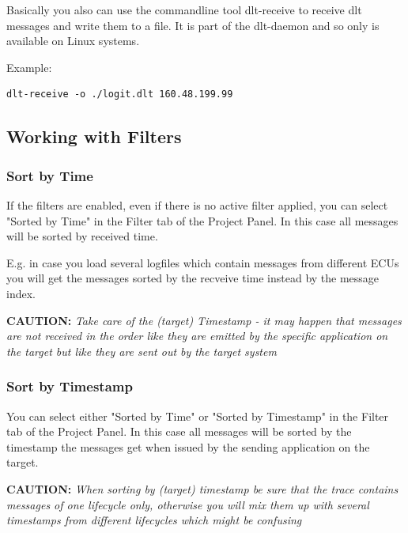 \documentclass[a4paper,11pt]{article}
\newcommand{\caution}[1]{\begin{ibox} \textbf{CAUTION:} \emph{#1} \end{ibox}}
\begin{document}
Basically you also can use the commandline tool dlt-receive to receive dlt messages and write them to a file.
It is part of the dlt-daemon and so only is available on Linux systems.

Example:

\begin{verbatim}
dlt-receive -o ./logit.dlt 160.48.199.99
\end{verbatim}



\pagebreak

\subsection{Working with Filters}
\label{workingwithfilters}


\subsubsection{Sort by Time}
\label{sortbytime}
If the filters are enabled, even if there is no active filter applied, you can select "Sorted by Time" in the
Filter tab of the Project Panel. In this case all messages will be sorted by received time.

E.g. in case you load several logfiles which contain messages from different ECUs you will get the messages sorted by the recveive time instead by the message index.

\caution{Take care of the (target) Timestamp - it may happen that messages are not received in the order
like they are emitted by the specific application on the target but like they are sent out by the target system}

\subsubsection{Sort by Timestamp}
\label{sortbytimestamp}
You can select either "Sorted by Time" or "Sorted by Timestamp" in the
Filter tab of the Project Panel. In this case all messages will be sorted by the timestamp the messages get when issued
by the sending application on the target. 

\caution{When sorting by (target) timestamp be sure that the trace contains messages of one lifecycle only, otherwise you will mix them up with
several timestamps from different lifecycles which might be confusing}
\end{document}
